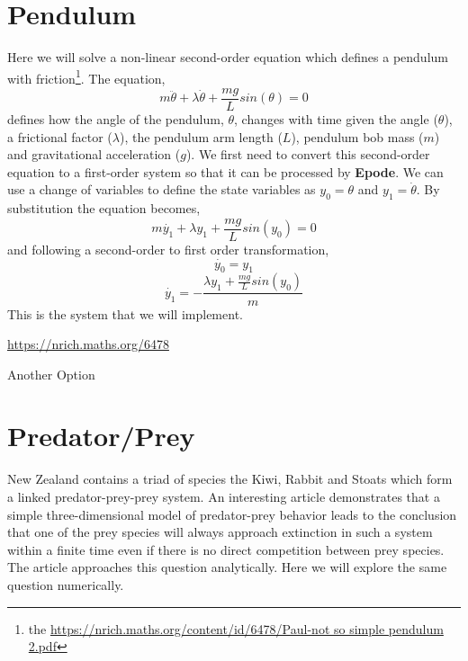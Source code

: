 \documentclass[letterpaper,10pt]{book}
\newcommand{\epode}[0]{\textbf{Epode}}
\begin{document}
    \section{Pendulum}
      Here we will solve a non-linear second-order equation which defines a pendulum with friction\footnote{the \url{https://nrich.maths.org/content/id/6478/Paul-not so simple pendulum 2.pdf}}.  The equation,
      \begin{equation}
	m\ddot{\theta} + \lambda\dot{\theta} + \frac{m g}{L}sin(\theta) = 0
      \end{equation}
      defines how the angle of the pendulum, $\theta$, changes with time given the angle ($\theta$), a frictional factor ($\lambda$), the pendulum arm length ($L$), pendulum bob mass ($m$) and gravitational acceleration ($g$).  We first need to convert this second-order equation to a first-order system so that it can be processed by \epode{}.  We can use a change of variables to define the state variables as $y_{0} = \theta$ and $y_{1} = \dot{\theta}$.  By substitution the equation becomes,
      \begin{equation}
	m\dot{y_1} + \lambda{}y_1 + \frac{m g}{L}sin(y_0) = 0
      \end{equation}
      and following a second-order to first order transformation,
      \begin{equation}
	\dot{y_0} = y_{1}
      \end{equation}
      \begin{equation}
	\dot{y_1} = -\frac{\lambda{}y_{1} + \frac{m g}{L}sin(y_0)}{m}
      \end{equation}
      This is the system that we will implement.
      
      \url{https://nrich.maths.org/6478}
      
      Another Option\cite{nelson1986pendulum}

      
    \section{Predator/Prey}
      New Zealand contains a triad of species the Kiwi, Rabbit and Stoats which form a linked predator-prey-prey system.  An interesting article \cite{korobeinikov1999global} demonstrates that a simple three-dimensional model of predator-prey behavior leads to the conclusion that one of the prey species will always approach extinction in such a system within a finite time even if there is no direct competition between prey species.  The article approaches this question analytically.  Here we will explore the same question numerically.
      
\end{document}
